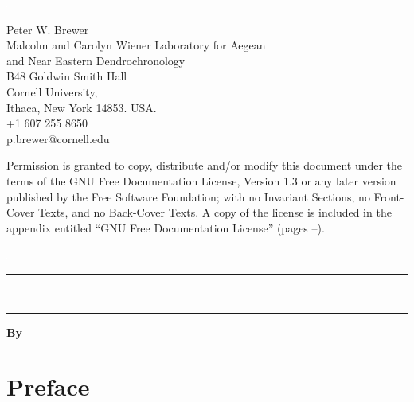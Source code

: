 


\thispagestyle{empty} 
\includegraphics{Images/pixel.png}
\vfill
\parbox[b]{11cm}{\raggedright

 Peter W. Brewer\\ Malcolm and Carolyn Wiener Laboratory for Aegean\\ and Near Eastern Dendrochronology \\
B48 Goldwin Smith Hall\\ Cornell University, \\ Ithaca, New York 14853. USA.\\[0.5cm] \Telefon\hspace{3mm}+1 607 255 8650 \\ \Letter\hspace{3mm}p.brewer@cornell.edu\\[15mm]}

{\footnotesize 
Permission is granted to copy, distribute and/or modify this document
under the terms of the GNU Free Documentation License, Version 1.3
or any later version published by the Free Software Foundation;
with no Invariant Sections, no Front-Cover Texts, and no Back-Cover Texts.
A copy of the license is included in the appendix entitled ``GNU Free Documentation License'' (pages \pageref{txt:FDLStart}--\pageref{txt:FDLEnd}).}



\newpage
{}
\setcounter{page}{1}
\thispagestyle{empty} 
{ \includegraphics{Images/pixel.png}\\[4cm] 
\hrule 
\vspace{5mm}
\Huge \bfseries \thetitle\\[3mm] 
\large{\thesubtitle}
\vspace{5mm}
\hrule
\vspace{3cm}
}
{
\normalsize
\textbf{By \authornames}\\[0.6cm]


}

\newpage


\tableofcontents


\cleardoublepage
{} 

\section*{Preface}
\thispagestyle{empty} 

